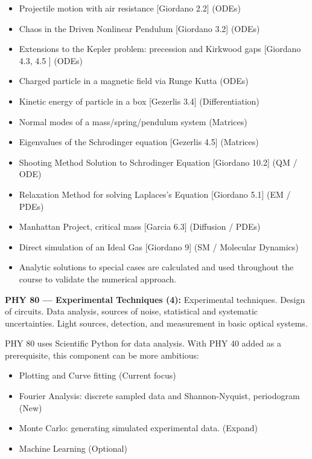 \documentclass[12pt]{article}
\begin{document}
\begin{itemize}
\item Projectile motion with air resistance [Giordano 2.2] (ODEs)
\item Chaos in the Driven Nonlinear Pendulum [Giordano 3.2] (ODEs) 
\item Extensions to the Kepler problem:  precession and Kirkwood gaps [Giordano 4.3, 4.5 ] (ODEs)
\item Charged particle in a magnetic field via Runge Kutta  (ODEs)
\item Kinetic energy of particle in a box [Gezerlis 3.4] (Differentiation)
\item Normal modes of a mass/spring/pendulum system (Matrices)  
\item Eigenvalues of the Schrodinger equation [Gezerlis 4.5] (Matrices)
\item Shooting Method Solution to Schrodinger Equation [Giordano 10.2] (QM / ODE)
\item Relaxation Method for solving Laplaces's Equation [Giordano 5.1] (EM / PDEs)
\item Manhattan Project, critical mass [Garcia 6.3] (Diffusion / PDEs)
\item Direct simulation of an Ideal Gas [Giordano 9] (SM / Molecular Dynamics)
\item Analytic solutions to special cases are calculated and used throughout the
  course to validate the numerical approach.
\end{itemize}  

\vskip 1cm
\noindent
{\bf PHY 80 --- Experimental Techniques (4):}
Experimental techniques. Design of circuits. Data analysis, sources of
noise, statistical and systematic uncertainties. Light sources,
detection, and measurement in basic optical systems.

PHY 80 uses Scientific Python for data analysis.  With PHY 40 added as
a prerequisite, this component can be more ambitious:
\begin{itemize}
\item Plotting and Curve fitting (Current focus)
\item Fourier Analysis: discrete sampled data and Shannon-Nyquist, periodogram (New)
\item Monte Carlo:  generating simulated experimental data. (Expand)
\item Machine Learning (Optional)
\end{itemize}

\newpage
\end{document}

